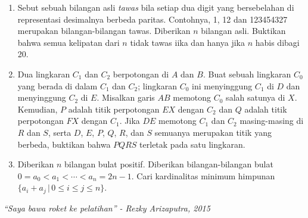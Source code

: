 \documentclass{article}
\begin{document}
	\begin{enumerate}
		\item Sebut sebuah bilangan asli \textit{tawas} bila setiap dua digit yang bersebelahan di representasi desimalnya berbeda paritas. Contohnya, 1, 12 dan 123454327 merupakan bilangan-bilangan tawas. Diberikan $n$ bilangan asli. Buktikan bahwa semua kelipatan dari $n$ tidak tawas iika dan hanya jika $n$ habis dibagi 20.
		\item Dua lingkaran $C_1$ dan $C_2$ berpotongan di $A$ dan $B$. Buat sebuah lingkaran $C_0$ yang berada di dalam $C_1$ dan $C_2$; lingkaran $C_0$ ini menyinggung $C_1$ di $D$ dan menyinggung $C_2$ di $E$. Misalkan garis $AB$ memotong $C_0$ salah satunya di $X$. Kemudian, $P$ adalah titik perpotongan $EX$ dengan $C_2$ dan $Q$ adalah titik perpotongan $FX$ dengan $C_1$. Jika $DE$ memotong $C_1$ dan $C_2$ masing-masing di $R$ dan $S$, serta $D$, $E$, $P$, $Q$, $R$, dan $S$ semuanya merupakan titik yang berbeda, buktikan bahwa $PQRS$ terletak pada satu lingkaran.
		\item Diberikan $n$ bilangan bulat positif. Diberikan bilangan-bilangan bulat $0 = a_0 < a_1 < \dotsb < a_n = 2n - 1$. Cari kardinalitas minimum himpunan $\{ a_i + a_j \, | \, 0 \le i \le j \le n \}$.
	\end{enumerate}
	\begin{center}
		\textit{``Saya bawa roket ke pelatihan'' - Rezky Arizaputra, 2015}
	\end{center}
\end{document}
